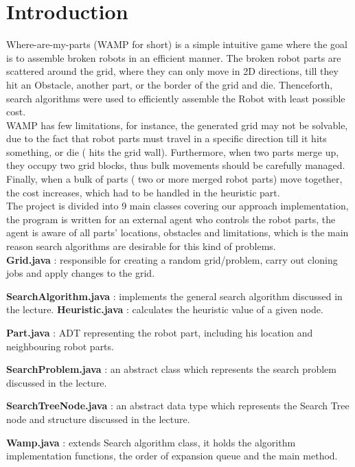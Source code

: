 \chapter{Introduction}
Where-are-my-parts (WAMP for short) is a simple intuitive game where the goal is to assemble broken robots in an efficient manner. The broken robot parts are scattered around the grid, where they can only move in 2D directions, till they hit an Obstacle, another part, or the border of the grid and die. Thenceforth, search algorithms were used to efficiently assemble the Robot with least possible cost. \\

WAMP has few limitations, for instance, the generated grid may not be solvable, due to the fact that robot parts must travel in a specific direction till it hits something, or die ( hits the grid wall). Furthermore, when two parts merge up, they occupy two grid blocks, thus bulk movements should be carefully managed. Finally, when a bulk of parts ( two or more merged robot parts) move together, the cost increases, which had to be handled in the heuristic part.\\

The project is divided into 9 main classes covering our approach implementation, the program is written for an external agent who controls the robot parts, the agent is aware of all parts' locations, obstacles and limitations, which is the main reason search algorithms are desirable for this kind of problems.\\

\textbf{Grid.java} : responsible for creating a random grid/problem, carry out cloning jobs and apply changes to the grid.

\textbf{SearchAlgorithm.java} : implements the general search algorithm discussed in the lecture.
\textbf{Heuristic.java }: calculates the heuristic value of a given node.

\textbf{Part.java} : ADT representing the robot part, including his location and neighbouring robot parts.

\textbf{SearchProblem.java} : an abstract class which represents the search problem discussed in the lecture.

\textbf{SearchTreeNode.java} : an abstract data type which represents the Search Tree node and structure discussed in the lecture. 

\textbf{Wamp.java} : extends Search algorithm class, it holds the algorithm implementation functions, the order of expansion queue and the main method.


